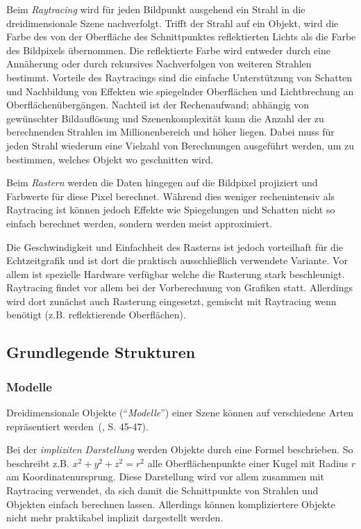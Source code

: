 \documentclass[twoside,a4paper,fleqn,12pt]{article}
\begin{document}
Beim \emph{Raytracing} wird für jeden Bildpunkt ausgehend ein Strahl in die dreidimensionale Szene nachverfolgt. Trifft
der Strahl auf ein Objekt, wird die Farbe des von der Oberfläche des Schnittpunktes reflektierten Lichts als die Farbe
des Bildpixels übernommen. Die reflektierte Farbe wird entweder durch eine Annäherung oder durch rekursives
Nachverfolgen von weiteren Strahlen bestimmt. Vorteile des Raytracings sind die einfache Unterstützung von Schatten und Nachbildung von Effekten wie spiegelnder
Oberflächen und Lichtbrechung an Oberflächenübergängen. Nachteil ist der Rechenaufwand; abhängig von gewünschter Bildauflösung und
Szenenkomplexität kann die Anzahl der zu berechnenden Strahlen im Millionenbereich und höher liegen.
Dabei muss für jeden Strahl wiederum eine Vielzahl von Berechnungen ausgeführt werden, um zu bestimmen, welches Objekt wo
geschnitten wird.

Beim \emph{Rastern} werden die Daten hingegen auf die Bildpixel projiziert und Farbwerte für diese Pixel berechnet.
Während dies weniger rechenintensiv als Raytracing ist können jedoch Effekte wie Spiegelungen und Schatten nicht so
einfach berechnet werden, sondern werden meist approximiert.

Die Geschwindigkeit und Einfachheit des Rasterns ist jedoch vorteilhaft für die Echtzeitgrafik und ist dort die praktisch
ausschließlich verwendete Variante. %
Vor allem ist spezielle Hardware verfügbar welche die Rasterung stark beschleunigt. %
Raytracing findet vor allem bei der Vorberechnung von Grafiken statt. Allerdings wird dort zunächst auch Rasterung eingesetzt,
gemischt mit Raytracing wenn benötigt (z.B. reflektierende Oberflächen). %

\subsection{Grundlegende Strukturen}

\subsubsection{Modelle}

Dreidimensionale Objekte ("`\emph{Modelle}"') einer Szene können auf verschiedene Arten repräsentiert werden~(\cite{watt_de}, S. 45-47). 

Bei der \emph{impliziten Darstellung} werden Objekte durch eine Formel beschrieben. So beschreibt z.B. $x^2 + y^2 + z^2 = r^2$
alle Oberflächenpunkte einer Kugel mit Radius $r$ am Koordinatenursprung. Diese Darstellung wird vor allem zusammen
mit Raytracing verwendet, da sich damit die Schnittpunkte von Strahlen und Objekten einfach berechnen lassen. Allerdings
können kompliziertere Objekte nicht mehr praktikabel implizit dargestellt werden.
\end{document}
